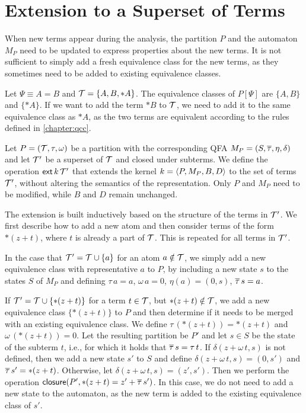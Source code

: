 \section{Extension to a Superset of Terms}

When new terms appear during the analysis, the partition $P$ and the automaton $M_P$ need to be updated to express properties about the new terms.
It is not sufficient to simply add a fresh equivalence class for the new terms, as they sometimes need to be added to existing equivalence classes.

\begin{example}
    Let $\Psi \equiv A = B$ and $\T = \{A, B, *A\}$.
    The equivalence classes of $P[\Psi]$ are $\{A, B\}$ and $\{*A\}$.
    If we want to add the term $*B$ to $\T$, we need to add it to the same equivalence class as $*A$, as the two terms are equivalent according to the rules defined in \cref{chapter:qcc}.
\end{example}

Let $P = (\T, \tau, \omega)$ be a partition with the corresponding QFA $M_P = (S, \otau, \eta, \delta)$ and let $\T'$ be a superset of $\T$ and closed under subterms.
We define the operation $\ext{k}{\T'}$ that extends the kernel $k = \angl{P, M_P, B, D}$ to the set of terms $\T'$, without altering the semantics of the representation.
Only $P$ and $M_P$ need to be modified, while $B$ and $D$ remain unchanged.

The extension is built inductively based on the structure of the terms in $\T'$.
We first describe how to add a new atom and then consider terms of the form $*(z+t)$, where $t$ is already a part of $\T$.
This is repeated for all terms in $\T'$.

In the case that $\T' = \T \cup \{a\}$ for an atom $a \notin \T$, we simply add a new equivalence class with representative $a$ to $P$, by including a new state $s$ to the states $S$ of $M_P$ and defining $\tau\,a = a$, $\omega\,a=0$, $\eta(a) = (0,s)$, $\otau\,s = a$.

If $\T' = \T \cup \{*(z+t)\}$ for a term $t \in \T$, but $*(z + t) \notin \T$, we add a new equivalence class $\{*(z+t)\}$ to $P$ and then determine if it needs to be merged with an existing equivalence class.
We define $\tau\,(*(z+t)) = *(z+t)$ and $\omega\,(*(z+t))=0$.
Let the resulting partition be $P'$ and let $s \in S$ be the state of the subterm $t$, i.e., for which it holds that $\otau\,s = \tau\,t$.
If $\delta(z + \omega\,t,s)$ is not defined, then we add a new state $s'$ to $S$ and define $\delta(z + \omega\,t, s) = (0, s')$ and $\otau\,s' = *(z+t)$.
Otherwise, let $\delta(z + \omega\,t, s) = (z', s')$.
Then we perform the operation $\closure{*(z + t)}{z'}{\otau\,s'}{P'}$.
In this case, we do not need to add a new state to the automaton,
as the new term is added to the existing equivalence class of $s'$.
